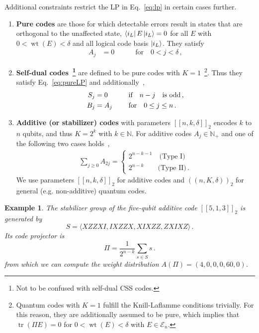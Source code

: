 \documentclass[12pt,a4paper]{amsart}
\DeclareMathOperator{\tr}{tr}
\DeclareMathOperator{\wt}{wt}
\newcommand{\bra}[1]{\mathinner{\langle #1|}}
\newcommand{\ket}[1]{\mathinner{|#1\rangle}}
\newtheorem{example}[theorem]{Example}
\newcommand{\N}{\mathds{N}}
\newcommand{\E}{\mathcal{E}}
\newcommand{\nn}{\nonumber}
\begin{document}
Additional constraints restrict the LP in Eq.~\eqref{eq:lp} in 
certain cases further.
\begin{enumerate}[label=(\alph*)]
\item {\bf Pure codes} are those for which detectable errors result in states that are orthogonal to the unaffected state, 
$\bra{i_L} E \ket{i_L} = 0$ for all $E$ with $0 < \wt(E) <\delta$ and all logical code basis $\ket{i_L}$. 
They satisfy
\begin{align}\label{eq:pureLP}
    A_j &= 0 \quad\quad \quad  \text{for} \quad 0 < j < \delta \,,
\end{align}
 
\item {\bf Self-dual  codes~\footnote{Not to be confused with self-dual CSS codes.}} are defined to be pure codes with $K=1$~\footnote{Quantum codes with $K=1$ fulfill the Knill-Laflamme conditions trivially. 
For this reason, they are additionally assumed to be pure, 
which implies that $\tr(\Pi E)=0$ for $0< \wt(E)<\delta $ with $E\in \E_n$.}.
Thus they satisfy Eq.~\eqref{eq:pureLP} and additionally~\cite{796376},
%
\begin{align}\label{eq:addLP}
 S_j &=0 \quad\quad \quad  \text{if} \quad  n-j \quad \text{is odd}\,, \nn\\
B_j &= A_j \hspace{-0.06cm}\quad\quad\,\,\, \text{for} \quad 0 \leq j \leq n\,.
\end{align}

\item {\bf Additive (or stabilizer) codes} with parameters $[\![n,k,\delta]\!]_2$ encodes $k$ to $n$ qubits, and thus $K=2^k$ with $k\in \N$.
For additive codes 
$A_j\in \mathbb{N}_+$
and
one of the following two cases holds~\cite{681315},
% 
\begin{align}\label{eq:add_type}
	\sum_{j\geq0} A_{2j} =
	\begin{cases}
2^{n-k-1} \quad \text{(Type I)} \\  2^{n-k} \quad \quad \!\text{(Type II)}\,.
	\end{cases}
\end{align}
% 
We use parameters $[\![n,k,\delta]\!]_2$ for additive codes and $(\!(n,K,\delta)\!)_2$ 
for general (e.g. non-additive) quantum codes. 
\end{enumerate}

\begin{example}\label{ex:enum}
The stabilizer group of the five-qubit additive code $[\![5,1,3]\!]_2$ 
is generated by 
\begin{equation}
 S= \langle XZZXI, IXZZX, XIXZZ, ZXIXZ \rangle  \,.
\end{equation}
Its code projector is
\begin{equation}
\Pi = \frac{1}{2^{n-k}} \sum_{s \in S}  s\,.
\end{equation}
% 
from which we can compute the weight distribution $A(\Pi) = (4, 0, 0, 0, 60, 0)$.

\end{example}
\end{document}
